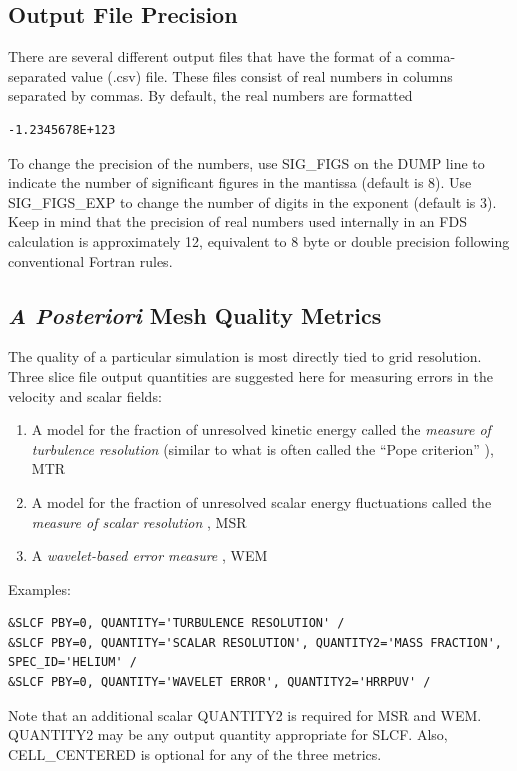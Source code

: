 \documentclass[11pt]{book}
\begin{document}
\subsection{Output File Precision}
\label{info:SIG_FIGS}

There are several different output files that have the format of a comma-separated value (.csv) file. These files consist of real numbers in columns separated by commas. By default, the real numbers are formatted
\begin{lstlisting}
-1.2345678E+123
\end{lstlisting}
To change the precision of the numbers, use {\ct SIG\_FIGS} on the {\ct DUMP} line to indicate the number of significant figures in the mantissa (default is 8). Use {\ct SIG\_FIGS\_EXP} to change the number of digits in the exponent (default is 3). Keep in mind that the precision of real numbers used internally in an FDS calculation is approximately 12, equivalent to 8 byte or double precision following conventional Fortran rules.


\subsection{\emph{A Posteriori} Mesh Quality Metrics}
\label{info:meshquality}

The quality of a particular simulation is most directly tied to grid resolution.  Three slice file output quantities are suggested here for measuring errors in the velocity and scalar fields:
\begin{enumerate}
\item A model for the fraction of unresolved kinetic energy called the \emph{measure of turbulence resolution} (similar to what is often called the ``Pope criterion'' \cite{Pope:2004}), MTR
\item A model for the fraction of unresolved scalar energy fluctuations called the \emph{measure of scalar resolution} \cite{Vervisch:2010}, MSR
\item A \emph{wavelet-based error measure} \cite{McDermott:2010}, WEM
\end{enumerate}
Examples:
\begin{lstlisting}
&SLCF PBY=0, QUANTITY='TURBULENCE RESOLUTION' /
&SLCF PBY=0, QUANTITY='SCALAR RESOLUTION', QUANTITY2='MASS FRACTION', SPEC_ID='HELIUM' /
&SLCF PBY=0, QUANTITY='WAVELET ERROR', QUANTITY2='HRRPUV' /
\end{lstlisting}
Note that an additional scalar {\ct QUANTITY2} is required for MSR and WEM.  {\ct QUANTITY2} may be any output quantity appropriate for {\ct SLCF}. Also, {\ct CELL\_CENTERED} is optional for any of the three metrics.
\end{document}
